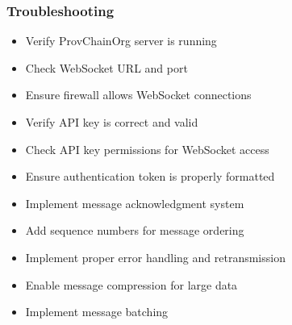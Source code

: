 \documentclass[letterpaper,10pt,english]{sphinxmanual}
\begin{document}
\subsubsection{Troubleshooting}
\label{\detokenize{api/websocket-api:troubleshooting}}\begin{description}
\begin{itemize}
\item {} 
\sphinxAtStartPar
Verify ProvChainOrg server is running

\item {} 
\sphinxAtStartPar
Check WebSocket URL and port

\item {} 
\sphinxAtStartPar
Ensure firewall allows WebSocket connections

\end{itemize}

\begin{itemize}
\item {} 
\sphinxAtStartPar
Verify API key is correct and valid

\item {} 
\sphinxAtStartPar
Check API key permissions for WebSocket access

\item {} 
\sphinxAtStartPar
Ensure authentication token is properly formatted

\end{itemize}

\begin{itemize}
\item {} 
\sphinxAtStartPar
Implement message acknowledgment system

\item {} 
\sphinxAtStartPar
Add sequence numbers for message ordering

\item {} 
\sphinxAtStartPar
Implement proper error handling and retransmission

\end{itemize}

\begin{itemize}
\item {} 
\sphinxAtStartPar
Enable message compression for large data

\item {} 
\sphinxAtStartPar
Implement message batching


\end{itemize}
\end{description}
\end{document}
